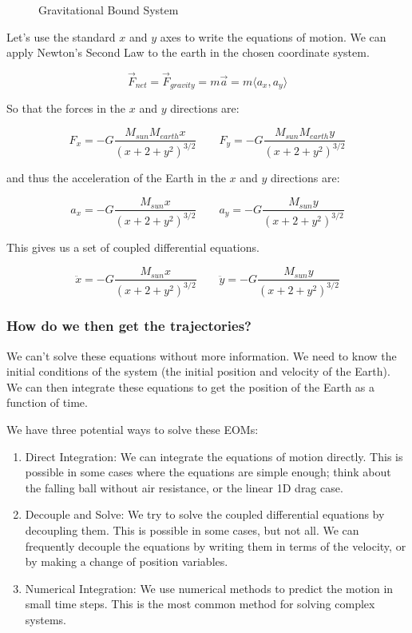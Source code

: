 \documentclass[11pt]{article}
\makeatletter
\providecommand{\tightlist}{%
      \setlength{\itemsep}{0pt}\setlength{\parskip}{0pt}}
\newcommand*\pandocbounded[1]{%
      \sbox\pandoc@box{#1}%
      \Gscale@div\@tempa\textheight{\dimexpr\ht\pandoc@box+\dp\pandoc@box\relax}%
      \Gscale@div\@tempb\linewidth{\wd\pandoc@box}%
      \ifdim\@tempb\p@<\@tempa\p@
        \let\@tempa\@tempb
      \fi
      \ifdim\@tempa\p@<\p@
        \scalebox{\@tempa}{\usebox\pandoc@box}%
      \else
        \usebox{\pandoc@box}%
      \fi
    }
\makeatother
\begin{document}
\begin{figure}
\centering
\pandocbounded{\texttt{[image: ../images/04\_notes\_grav\_03.png]}}
\caption{Gravitational Bound System}
\end{figure}

Let's use the standard \(x\) and \(y\) axes to write the equations of
motion. We can apply Newton's Second Law to the earth in the chosen
coordinate system.

\[\vec{F}_{net} = \vec{F}_{gravity} = m\vec{a} = m\langle a_x, a_y \rangle\]

So that the forces in the \(x\) and \(y\) directions are:

\[F_x = -G \dfrac{M_{sun} M_{earth}x}{(x+2+y^2)^{3/2}} \qquad F_y = -G \dfrac{M_{sun} M_{earth}y}{(x+2+y^2)^{3/2}}\]

and thus the acceleration of the Earth in the \(x\) and \(y\) directions
are:

\[a_x = -G \dfrac{M_{sun} x}{(x+2+y^2)^{3/2}} \qquad a_y = -G \dfrac{M_{sun} y}{(x+2+y^2)^{3/2}}\]

This gives us a set of coupled differential equations.

\[\ddot{x} = -G \dfrac{M_{sun} x}{(x+2+y^2)^{3/2}} \qquad \ddot{y} = -G \dfrac{M_{sun} y}{(x+2+y^2)^{3/2}}\]

\subsubsection{How do we then get the
trajectories?}\label{how-do-we-then-get-the-trajectories}

We can't solve these equations without more information. We need to know
the initial conditions of the system (the initial position and velocity
of the Earth). We can then integrate these equations to get the position
of the Earth as a function of time.

We have three potential ways to solve these EOMs:

\begin{enumerate}
\def\labelenumi{\arabic{enumi})}
\tightlist
\item
  Direct Integration: We can integrate the equations of motion directly.
  This is possible in some cases where the equations are simple enough;
  think about the falling ball without air resistance, or the linear 1D
  drag case.
\item
  Decouple and Solve: We try to solve the coupled differential equations
  by decoupling them. This is possible in some cases, but not all. We
  can frequently decouple the equations by writing them in terms of the
  velocity, or by making a change of position variables.
\item
  Numerical Integration: We use numerical methods to predict the motion
  in small time steps. This is the most common method for solving
  complex systems.
\end{enumerate}
\end{document}
